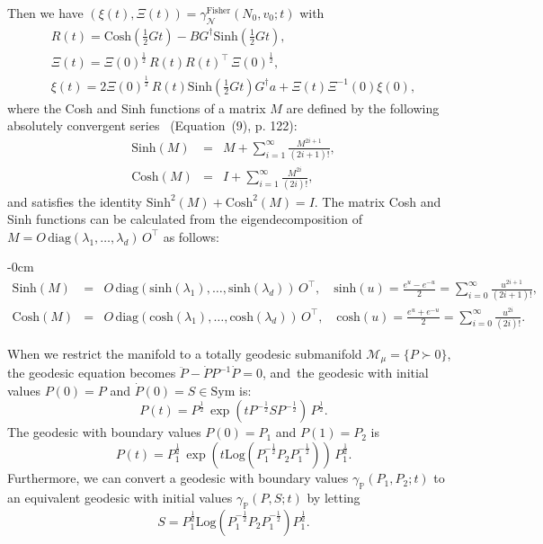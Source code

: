 \documentclass[entropy,article,accept,oneauthor,pdftex,entropy]{Definitions/mdpi}
\def\Sym{\mathrm{Sym}}
\def\Log{{\mathrm{Log}}}
\def\Sinh{\mathrm{Sinh}}
\def\Cosh{\mathrm{Cosh}}
\def\sinh{\mathrm{sinh}}
\def\cosh{\mathrm{cosh}}
\def\bbP{\mathbb{P}}
\def\calM{\mathcal{M}}
\def\Sym{\mathrm{Sym}}
\def\diag{\mathrm{diag}}
\def\Fisher{\mathrm{Fisher}}
\def\calN{\mathcal{N}}
\begin{document}
Then we have $(\xi(t),\Xi(t))=\gamma_\calN^\Fisher(N_0,v_0;t)$ with
\begin{eqnarray*}
R(t)=\Cosh\left(\frac{1}{2} G  t\right) -BG^\dagger\Sinh\left(\frac{1}{2} G  t\right),\\
\Xi(t)=\Xi(0)^{\frac{1}{2}}\, R(t)R(t)^\top\, \Xi(0)^{\frac{1}{2}},\\
\xi(t)=2\Xi(0)^{\frac{1}{2}}\, R(t)\Sinh\left(\frac{1}{2} G  t\right)G^\dagger a+\Xi(t)\Xi^{-1}(0)\xi(0),
\end{eqnarray*}
where the Cosh and Sinh functions of a matrix $M$ are defined by the following absolutely convergent series~\cite{calvo1991explicit} ({Equation~(9),} %
 p. 122):
\begin{eqnarray*}
\Sinh(M) &=& M +\sum_{i=1}^\infty \frac{M^{2i+1}}{(2i+1)!},\\
\Cosh(M) &=& I+ \sum_{i=1}^\infty \frac{M^{2i}}{(2i)!},
\end{eqnarray*}
and satisfies the identity $\Sinh^2(M)+\Cosh^2(M)=I$.
The matrix Cosh and Sinh functions can be calculated from the eigendecomposition of 
$M=O\, \diag(\lambda_1,\ldots,\lambda_d)\, O^\top$ as follows:

\begin{adjustwidth}{-\extralength}{0cm}
\centering %
\begin{eqnarray*}
\Sinh(M) &=& O\, \diag(\sinh(\lambda_1),\ldots,\sinh(\lambda_d))\, O^\top,\quad \sinh(u)=\frac{e^u-e^{-u}}{2}=
\sum_{i=0}^\infty \frac{u^{2i+1}}{(2i+1)!}, \\
\Cosh(M) &=& O\, \diag(\cosh(\lambda_1),\ldots,\cosh(\lambda_d))\, O^\top,\quad \cosh(u)=\frac{e^u+e^{-u}}{2}
=\sum_{i=0}^\infty \frac{u^{2i}}{(2i)!}.
\end{eqnarray*}
\end{adjustwidth}
 


When we restrict the manifold to a totally geodesic submanifold $\calM_\mu=\{P\succ 0\}$, 
the geodesic equation becomes $\ddot{P}-\dot{P}P^{-1}\dot{P}=0$, and~the
geodesic with initial values $P(0)=P$ and $\dot{P}(0)=S\in\Sym$ is:
$$
P(t)=P^{\frac{1}{2}}\, \exp\left(t P^{-\frac{1}{2}} S P^{-\frac{1}{2}}\right)\, P^{\frac{1}{2}}.
$$
The geodesic with boundary values   $P(0)=P_1$ and $P(1)=P_2$ is
$$
P(t)=P_1^{\frac{1}{2}}\, \exp\left(t \Log(P_1^{-\frac{1}{2}} P_2 P_1^{-\frac{1}{2}})\right)\, P_1^{\frac{1}{2}}.
$$
Furthermore, we can convert a geodesic with boundary values $\gamma_\bbP(P_1,P_2;t)$ to an equivalent geodesic with initial values
$\gamma_\bbP(P,S;t)$ by letting
$$
S= P_1^{\frac{1}{2}} \Log (P_1^{-\frac{1}{2}} P_2  P_1^{-\frac{1}{2}}) P_1^{\frac{1}{2}}.
$$
\end{document}
